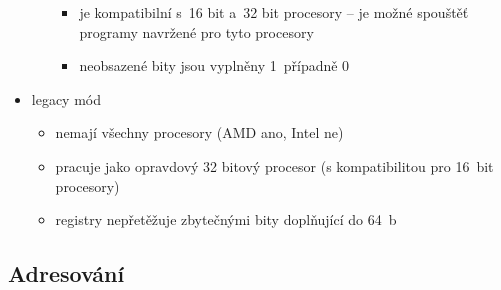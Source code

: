 \documentclass[a4paper,12pt]{article}
\providecommand{\tightlist}{%
\setlength{\itemsep}{0pt}\setlength{\parskip}{0pt}}
\begin{document}
\begin{itemize}
\begin{itemize}
    \begin{itemize}
    \tightlist
    \item je kompatibilní s~16 bit a~32 bit procesory -- je možné spouštěť
      programy navržené pro tyto procesory
    \item neobsazené bity jsou vyplněny 1~případně 0
    \end{itemize}
  \end{itemize}
\item legacy mód

  \begin{itemize}
  \tightlist
  \item nemají všechny procesory (AMD ano, Intel ne)
  \item pracuje jako opravdový 32 bitový procesor (s kompatibilitou pro 16~bit
  procesory)
  \item registry nepřetěžuje zbytečnými bity doplňující do 64~b
  \end{itemize}
\end{itemize}

\subsection{Adresování}
\end{document}
